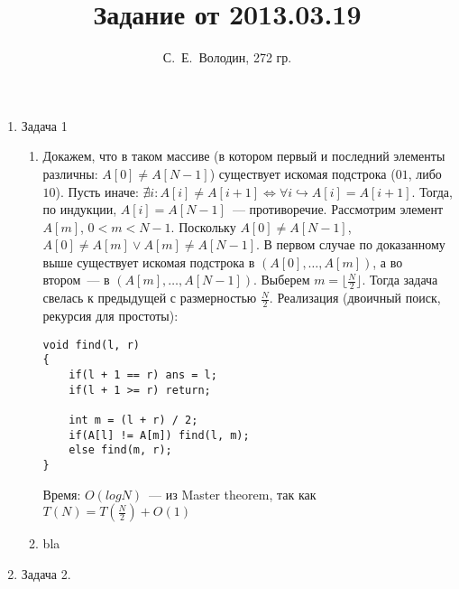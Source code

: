 \documentclass{article}
\title{Задание от 2013.03.19}
\author{С.~Е.~Володин, 272 гр.}
\date{}
\begin{document}
\maketitle
\begin{enumerate} 
\item Задача 1
\begin{enumerate}
\item Докажем, что в таком массиве (в котором первый и последний элементы различны: $A[0]\neq A[N-1]$) существует искомая подстрока ($01$, либо $10$). Пусть иначе: $\nexists i:A[i]\neq A[i+1]\Leftrightarrow\forall i\hookrightarrow A[i]=A[i+1]$. Тогда, по индукции, $A[i]=A[N-1]$~--- противоречие.\newline
Рассмотрим элемент $A[m]$, $0<m<N-1$. Поскольку $A[0]\neq A[N-1]$, $A[0]\neq A[m] \vee A[m] \neq A[N-1]$. В первом случае по доказанному выше существует искомая подстрока в $(A[0],\dots,A[m])$, а во втором~--- в $(A[m],\dots,A[N-1])$. Выберем $m=\lfloor\frac{N}{2}\rfloor$. Тогда задача свелась к предыдущей с размерностью $\frac{N}{2}$.\newline
Реализация (двоичный поиск, рекурсия для простоты):\begin{verbatim}void find(l, r)
{
    if(l + 1 == r) ans = l;
    if(l + 1 >= r) return;

    int m = (l + r) / 2;
    if(A[l] != A[m]) find(l, m);
    else find(m, r);
}
\end{verbatim}
Время: $O(logN)$~--- из Master theorem, так как $T(N)=T(\frac{N}{2})+O(1)$

\item bla
\end{enumerate}
\item Задача 2.
\end{enumerate}
\end{document}
